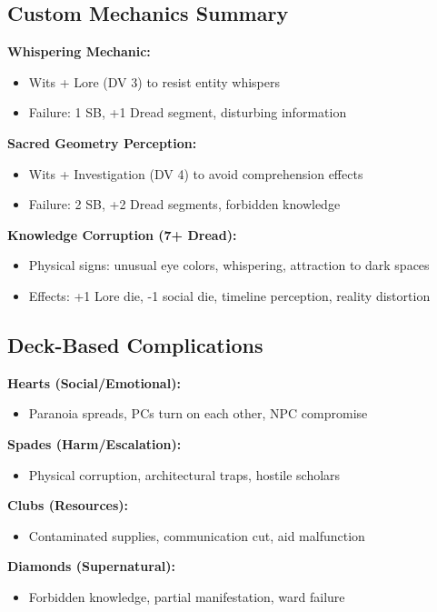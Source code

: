 \documentclass[11pt]{article}
\begin{document}
\subsection*{Custom Mechanics Summary}

\textbf{Whispering Mechanic:}
\begin{itemize}
\item Wits + Lore (DV 3) to resist entity whispers
\item Failure: 1 SB, +1 Dread segment, disturbing information
\end{itemize}

\textbf{Sacred Geometry Perception:}
\begin{itemize}
\item Wits + Investigation (DV 4) to avoid comprehension effects
\item Failure: 2 SB, +2 Dread segments, forbidden knowledge
\end{itemize}

\textbf{Knowledge Corruption (7+ Dread):}
\begin{itemize}
\item Physical signs: unusual eye colors, whispering, attraction to dark spaces
\item Effects: +1 Lore die, -1 social die, timeline perception, reality distortion
\end{itemize}

\subsection*{Deck-Based Complications}

\textbf{Hearts (Social/Emotional):}
\begin{itemize}
\item Paranoia spreads, PCs turn on each other, NPC compromise
\end{itemize}

\textbf{Spades (Harm/Escalation):}
\begin{itemize}
\item Physical corruption, architectural traps, hostile scholars
\end{itemize}

\textbf{Clubs (Resources):}
\begin{itemize}
\item Contaminated supplies, communication cut, aid malfunction
\end{itemize}

\textbf{Diamonds (Supernatural):}
\begin{itemize}
\item Forbidden knowledge, partial manifestation, ward failure
\end{itemize}
\end{document}
